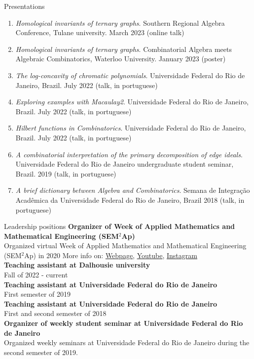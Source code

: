\documentclass{resume} %
\begin{document}
\begin{rSection}{Presentations}
\begin{enumerate}[label={}]
        \item \textit{Homological invariants of ternary graphs}. Southern Regional Algebra Conference, Tulane university. March 2023 (online talk)
        \item \textit{Homological invariants of ternary graphs}. Combinatorial Algebra meets Algebraic Combinatorics, Waterloo University. January 2023 (poster)
        \item \textit{The log-concavity of chromatic polynomials}. Universidade Federal do Rio de Janeiro, Brazil. July 2022 (talk, in portuguese)
        \item \textit{Exploring examples with Macaulay2}. Universidade Federal do Rio de Janeiro, Brazil. July 2022 (talk, in portuguese)
        \item \textit{Hilbert functions in Combinatorics}. Universidade Federal do Rio de Janeiro, Brazil. July 2022 (talk, in portuguese)
        \item \textit{A combinatorial interpretation of the primary decomposition of edge ideals}. Universidade Federal do Rio de Janeiro undergraduate student seminar, Brazil. 2019 (talk, in portuguese)
        \item \textit{A brief dictionary between Algebra and Combinatorics}. Semana de Integração Acadêmica da Universidade Federal do Rio de Janeiro, Brazil 2018 (talk, in portuguese)
    \end{enumerate}
\end{rSection}

\newpage

\begin{rSection}{Leadership positions}
{\bf Organizer of Week of Applied Mathematics and Mathematical Engineering (SEM$^2$Ap)}
\\
Organized virtual Week of Applied Mathematics and Mathematical Engineering (SEM$^2$Ap) in 2020
{\scriptsize More info on:  \href{http://semap.rio.br/2020/en/}{Webpage},   \href{https://www.youtube.com/channel/UC14NMQ5cOsSuLrAQGGa2T4Q}{Youtube}, 
\href{https://www.instagram.com/semap.rio/}{Instagram}}
\\
{\bf Teaching assistant at Dalhousie university}
\\
Fall of 2022 - current
\\
{\bf Teaching assistant at Universidade Federal do Rio de Janeiro} 
\\
First semester of 2019
\\
{\bf Teaching assistant at Universidade Federal do Rio de Janeiro} 
\\
First and second semester of 2018
\\
{\bf Organizer of weekly student seminar at Universidade Federal do Rio de Janeiro}
\\
Organized weekly seminars at Universidade Federal do Rio de Janeiro during the second semester of 2019.
\end{rSection}
\end{document}
